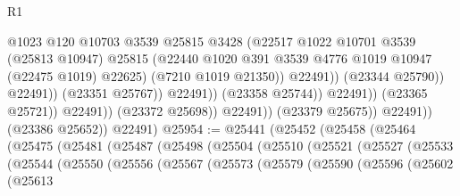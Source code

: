 \begin{lexlean}{R1}
\begin{coremodule}
                                                @1023
                                                @120
                                                @10703
                                                @3539
                                                @25815
                                                @3428
                                                (@22517
                                                  @1022
                                                  @10701
                                                  @3539
                                                  (@25813 @10947)
                                                  @25815
                                                  (@22440
                                                    @1020
                                                    @391
                                                    @3539
                                                    @4776
                                                    @1019
                                                    @10947
                                                    (@22475 @1019)
                                                    @22625)
                                                  (@7210 @1019 @21350))
                                                @22491))
                                            (@23344 @25790))
                                          @22491))
                                      (@23351 @25767))
                                    @22491))
                                (@23358 @25744))
                              @22491))
                          (@23365 @25721))
                        @22491))
                    (@23372 @25698))
                  @22491))
              (@23379 @25675))
            @22491))
        (@23386 @25652))
      @22491)
@25954 := @25441
    (@25452
      (@25458
        (@25464
          (@25475
            (@25481
              (@25487
                (@25498
                  (@25504
                    (@25510
                      (@25521
                        (@25527
                          (@25533
                            (@25544
                              (@25550
                                (@25556
                                  (@25567
                                    (@25573
                                      (@25579
                                        (@25590
                                          (@25596
                                            (@25602
                                              (@25613

\end{coremodule}
\end{lexlean}
